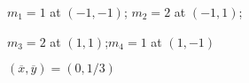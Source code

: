 {$m_1=1$  at $(-1,-1)$; \quad $m_2=2$  at $(-1,1)$;\par $m_3=2$  at $(1,1)$;\quad $m_4=1$ at $(1,-1)$
}
{$(\overline{x},\overline{y}) = (0,1/3)$
}